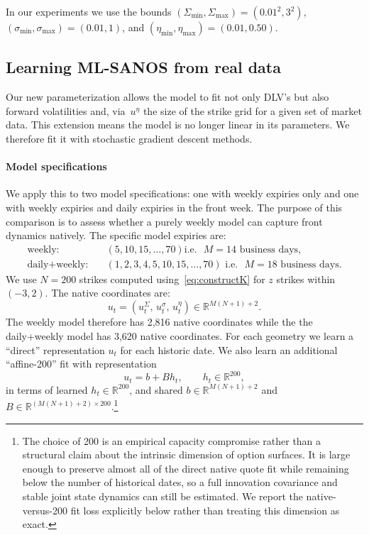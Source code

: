 \documentclass[11pt,a4paper]{article}
\newcommand{\R}{\mathbb{R}}
\begin{document}
In our
experiments we use the bounds
$(\Sigma_{\min},\Sigma_{\max})=(0.01^2,3^2)$,
$(\sigma_{\min},\sigma_{\max})=(0.01,1)$, and
$(\eta_{\min},\eta_{\max})=(0.01,0.50)$. 

\subsection{Learning ML-SANOS from real data}
\label{sec:learning-ml-sanos}

Our new parameterization allows the model to fit not only DLV's but also forward volatilities and, via~$u^\eta$ the size of the strike grid
for a given set of market data. This extension means the model is no longer linear in its parameters. We therefore fit it with 
stochastic gradient descent methods.

\paragraph{Model specifications}

We apply this to two model specifications: one with weekly expiries only and one with weekly expiries and daily expiries in the front week. The purpose
of this comparison is to assess whether a purely weekly model can capture front dynamics natively. The specific model expiries are:
\begin{align*}
  \text{weekly:}\quad
    &(5,10,15,\ldots,70)\text{i.e.~ $M=14$ business days},\\
  \text{daily+weekly:}\quad
    &(1,2,3,4,5,10,15,\ldots,70)\text{ i.e.~ $M=18$ business days}.
\end{align*}
We use $N=200$ strikes computed using~\eqref{eq:constructK} for $z$ strikes within $(-3,2)$.
The native coordinates are:
\begin{equation}
  u_t=\left(
u_t^{\Sigma},\,
            u_t^{\sigma},\,
      u_t^{\eta}
      \right)
  \in\R^{M(N+1)+2}.
  \label{eq:production-native-state}
\end{equation}
The weekly model therefore has 
2,816 native coordinates while the the daily+weekly model has 3,620 native
coordinates.  
For each geometry we learn a ``direct'' representation $u_t$ for each historic date. We also learn
an additional ``affine-200''
fit with representation
\begin{equation}
  u_t=b+B h_t,
  \qquad h_t\in\R^{200},
  \label{eq:affine-decoder}
\end{equation}
in terms of learned $h_t\in\R^{200}$,
and shared $b\in\R^{M(N+1)+2}$ and
$B\in\R^{(M(N+1)+2)\times200}$.\footnote{
The choice of 200 is an empirical capacity compromise rather than a structural
claim about the intrinsic dimension of option surfaces.  It is large enough
to preserve almost all of the direct native quote fit while remaining below
the number of historical dates, so a full innovation covariance and stable
joint state dynamics can still be estimated.  We report the native-versus-200
fit loss explicitly below rather than treating this dimension as exact.
}
\end{document}
